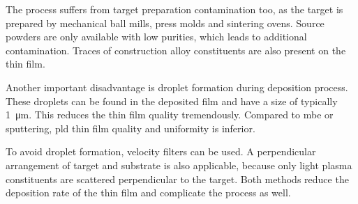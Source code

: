 The process suffers from target preparation contamination too, as the target is 
prepared by mechanical ball mills, press molds and sintering ovens.
Source powders are only available with low purities, which leads to additional 
contamination. 
Traces of construction alloy constituents are also present on the thin film. 

Another important disadvantage is droplet formation during deposition process.
These droplets can be found in the deposited film and have a size of typically
\qty{1}{\micro \meter}.
This reduces the thin film quality tremendously.
Compared to \ac{mbe} or sputtering, \ac{pld} thin film quality and uniformity 
is inferior.  

To avoid droplet formation, velocity filters can be used.
A perpendicular arrangement of target and substrate is also applicable, because only
light plasma constituents are scattered perpendicular to the target.
Both methods reduce the deposition rate of the thin film and complicate the process 
as well.